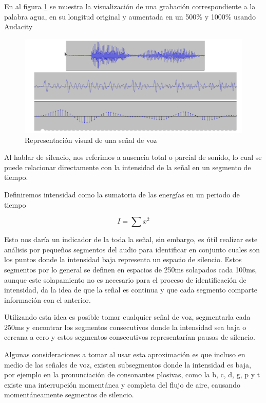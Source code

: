 En al figura \ref{img:pcm} se muestra la visualización de una grabación correspondiente a la palabra agua, en su longitud original y aumentada en un 500\% y 1000\% usando Audacity \cite{audacity}
\begin{figure}[H]
\caption{Representación visual de una señal de voz \cite{hableomsDeVoz}}
\label{img:pcm}
\includegraphics[width=\textwidth]{imagenes/04_01_pcm.png}
\end{figure}

Al hablar de silencio, nos referimos a ausencia total o parcial de sonido, lo cual se puede relacionar directamente con la intensidad de la señal en un segmento de tiempo.

Definiremos intensidad como la sumatoria de las energías en un periodo de tiempo  \cite{Jurafsky2000SpeechRecognition}    

\begin{equation}
\label{eq:energy}
I = \sum{x^2}  
\end{equation}

Esto nos daría un indicador de la toda la señal, sin embargo, es útil realizar este análisis por pequeños segmentos del audio para identificar en conjunto cuales son los puntos donde la intensidad baja representa un espacio de silencio. Estos segmentos por lo general se definen en espacios de 250ms solapados cada 100ms, aunque este solapamiento no es necesario para el proceso de identificación de intensidad, da la idea de que la señal es continua y que cada segmento comparte información con el anterior.

Utilizando esta idea es posible tomar cualquier señal de voz, segmentarla cada 250ms y encontrar los segmentos consecutivos donde la intensidad sea baja o cercana a cero y estos segmentos consecutivos representarían pausas de silencio.

Algunas consideraciones a tomar al usar esta aproximación es que incluso en medio de las señales de voz, existen subsegmentos donde la intensidad es baja, por ejemplo en la pronunciación de consonantes plosivas, como la b, c, d, g, p y t existe una interrupción momentánea y completa del flujo de aire, causando momentáneamente segmentos de silencio.


